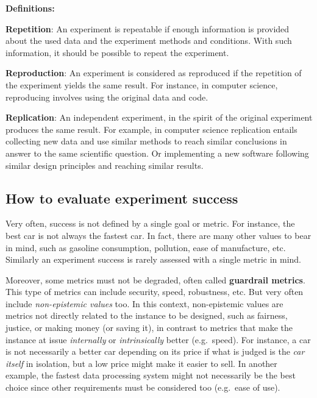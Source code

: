 \documentclass[
]{book}
\begin{document}
\begin{tipbox}

\textbf{Definitions:}

\textbf{Repetition}: An experiment is repeatable if enough information is provided about the used data and the experiment methods and conditions. With such information, it should be possible to repeat the experiment.

\textbf{Reproduction}: An experiment is considered as reproduced if the repetition of the experiment yields the same result. For instance, in computer science, reproducing involves using the original data and code.

\textbf{Replication}: An independent experiment, in the spirit of the original experiment produces the same result. For example, in computer science replication entails collecting new data and use similar methods to reach similar conclusions in answer to the same scientific question. Or implementing a new software following similar design principles and reaching similar results.

\end{tipbox}

\hypertarget{how-to-evaluate-experiment-success}{%
\subsection{How to evaluate experiment success}\label{how-to-evaluate-experiment-success}}

Very often, success is not defined by a single goal or metric. For instance, the best car is not always the fastest car. In fact, there are many other values to bear in mind, such as gasoline consumption, pollution, ease of manufacture, etc. Similarly an experiment success is rarely assessed with a single metric in mind.

Moreover, some metrics must not be degraded, often called \textbf{guardrail metrics}. This type of metrics can include security, speed, robustness, etc. But very often include \emph{non-epistemic values} too. In this context, non-epistemic values are metrics not directly related to the instance to be designed, such as fairness, justice, or making money (or saving it), in contrast to metrics that make the instance at issue \emph{internally} or \emph{intrinsically} better (e.g.~speed). For instance, a car is not necessarily a better car depending on its price if what is judged is the \emph{car itself} in isolation, but a low price might make it easier to sell. In another example, the fastest data processing system might not necessarily be the best choice since other requirements must be considered too (e.g.~ease of use).
\end{document}
